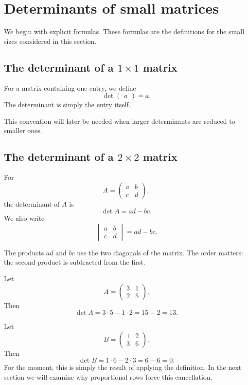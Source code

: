 \section{Determinants of small matrices}

We begin with explicit formulas. These formulas are the definitions for the small sizes considered in this section.

\subsection{The determinant of a \(1\times1\) matrix}

For a matrix containing one entry, we define
\[
\det\begin{pmatrix}a\end{pmatrix}=a.
\]
The determinant is simply the entry itself.

This convention will later be needed when larger determinants are reduced to smaller ones.

\subsection{The determinant of a \(2\times2\) matrix}

\begin{definitionbox}
For
\[
A=\begin{pmatrix}a&b\\c&d\end{pmatrix},
\]
the determinant of \(A\) is
\[
\det A=ad-bc.
\]
We also write
\[
\begin{vmatrix}a&b\\c&d\end{vmatrix}=ad-bc.
\]
\end{definitionbox}

The products \(ad\) and \(bc\) use the two diagonals of the matrix. The order matters: the second product is subtracted from the first.

\begin{examplebox}
Let
\[
A=\begin{pmatrix}3&1\\2&5\end{pmatrix}.
\]
Then
\[
\det A=3\cdot5-1\cdot2=15-2=13.
\]
\end{examplebox}

\begin{examplebox}
Let
\[
B=\begin{pmatrix}1&2\\3&6\end{pmatrix}.
\]
Then
\[
\det B=1\cdot6-2\cdot3=6-6=0.
\]
For the moment, this is simply the result of applying the definition. In the next section we will examine why proportional rows force this cancellation.
\end{examplebox}

